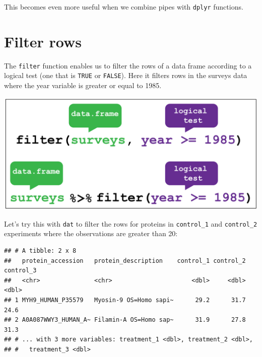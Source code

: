 \documentclass[12pt,]{book}
\newenvironment{Shaded}{\begin{snugshade}}{\end{snugshade}}
\newcommand{\KeywordTok}[1]{\textcolor[rgb]{0.13,0.29,0.53}{\textbf{#1}}}
\newcommand{\DecValTok}[1]{\textcolor[rgb]{0.00,0.00,0.81}{#1}}
\newcommand{\StringTok}[1]{\textcolor[rgb]{0.31,0.60,0.02}{#1}}
\newcommand{\OperatorTok}[1]{\textcolor[rgb]{0.81,0.36,0.00}{\textbf{#1}}}
\newcommand{\NormalTok}[1]{#1}
\theoremstyle{definition}
\theoremstyle{definition}
\theoremstyle{definition}
\theoremstyle{remark}
\begin{document}
This becomes even more useful when we combine pipes with \texttt{dplyr}
functions.

\section{Filter rows}\label{filter}

The \texttt{filter} function enables us to filter the rows of a data
frame according to a logical test (one that is \texttt{TRUE} or
\texttt{FALSE}). Here it filters rows in the surveys data where the year
variable is greater or equal to 1985.

\begin{center}\includegraphics[width=0.8\linewidth]{img/dplyr_filter} \end{center}

Let's try this with \texttt{dat} to filter the rows for proteins in
\texttt{control\_1} and \texttt{control\_2} experiments where the
observations are greater than 20:

\begin{Shaded}
\end{Shaded}

\begin{verbatim}
## # A tibble: 2 x 8
##   protein_accession   protein_description    control_1 control_2 control_3
##   <chr>               <chr>                      <dbl>     <dbl>     <dbl>
## 1 MYH9_HUMAN_P35579   Myosin-9 OS=Homo sapi~      29.2      31.7      24.6
## 2 A0A087WWY3_HUMAN_A~ Filamin-A OS=Homo sap~      31.9      27.8      31.3
## # ... with 3 more variables: treatment_1 <dbl>, treatment_2 <dbl>,
## #   treatment_3 <dbl>
\end{verbatim}
\end{document}

